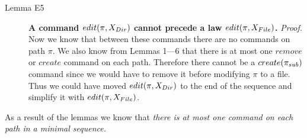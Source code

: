 \begin{description}
\item[Lemma E5] {\bf A command \(edit(\pi,X_{Dir})\) cannot precede a law
\(edit(\pi,X_{File})\).} \emph{Proof.} Now we know that between these
commands there are no commands on path \(\pi\). We also know from Lemmas
1---6 that there is at most one \(remove\) or \(create\) command on each
path. Therefore
there cannot be a \(create(\pi_{sub})\) command since we would have to
remove it before modifying \(\pi\) to a file.
Thus we could have moved \(edit(\pi,X_{Dir})\) to the end of the sequence
and simplify it with \(edit(\pi,X_{File})\).
\end{description}

\label{theorem:conc}

As a result of the lemmas we know that
\emph{there is at most one command on each path in a minimal sequence.}

